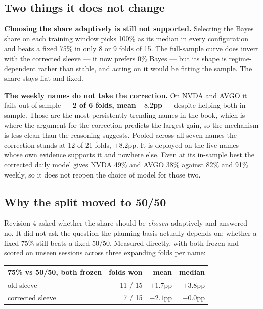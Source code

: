 \documentclass[11pt]{article}
\begin{document}
\subsection{Two things it does not change}

\textbf{Choosing the share adaptively is still not supported.} Selecting the Bayes share on each
training window picks 100\% as its median in every configuration and beats a fixed 75\% in only 8
or 9 folds of 15. The full-sample curve does invert with the corrected sleeve --- it now prefers
0\% Bayes --- but its shape is regime-dependent rather than stable, and acting on it would be
fitting the sample. The share stays flat and fixed.

\textbf{The weekly names do not take the correction.} On NVDA and AVGO it fails out of sample ---
\textbf{2 of 6 folds, mean $-8.2$pp} --- despite helping both in sample. Those are the most
persistently trending names in the book, which is where the argument for the correction predicts
the largest gain, so the mechanism is less clean than the reasoning suggests. Pooled across all
seven names the correction stands at 12 of 21 folds, $+8.2$pp. It is deployed on the five names
whose own evidence supports it and nowhere else. Even at its in-sample best the corrected daily
model gives NVDA 49\% and AVGO 38\% against 82\% and 91\% weekly, so it does not reopen the
choice of model for those two.

\subsection{Why the split moved to 50/50}

Revision 4 asked whether the share should be \emph{chosen} adaptively and answered no. It did not
ask the question the planning basis actually depends on: whether a fixed 75\% still beats a fixed
50/50. Measured directly, with both frozen and scored on unseen sessions across three expanding
folds per name:

\begin{table}[H]\centering\small
\begin{tabular}{lrrr}
\toprule
\textbf{75\% vs 50/50, both frozen} & \textbf{folds won} & \textbf{mean} & \textbf{median}\\
\midrule
\rowcolor{bckeep} old sleeve & 11 / 15 & $+1.7$pp & $+3.8$pp\\
corrected sleeve & 7 / 15 & $-2.1$pp & $-0.0$pp\\
\bottomrule
\end{tabular}
\end{table}
\end{document}

